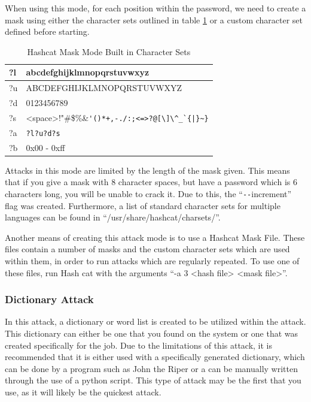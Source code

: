 				When using this mode, for each position within the password, we need to create a mask using either the character sets outlined in table \ref{tab:HashcatMaskCharSets} or a custom character set defined before starting. 
				\begin{table}[htb]
					\centering
				\begin{adjustbox}{max width=1\textwidth}
					\begin{tabular}{| l | l |}
						\hline
						?l & abcdefghijklmnopqrstuvwxyz \\ \hline
						?u & ABCDEFGHIJKLMNOPQRSTUVWXYZ \\ \hline
						?d & 0123456789 \\ \hline
						?s & <space>!"\#\$\%\&\verb!'()*+,-./:;<=>?@[\]\^_`{|}~}! \\ \hline
						?a & \verb+?l?u?d?s+ \\ \hline
						?b & 0x00 - 0xff \\ \hline
					\end{tabular}
				\end{adjustbox}
					\caption{Hashcat Mask Mode Built in Character Sets}
					\label{tab:HashcatMaskCharSets}
				\end{table}
				Attacks in this mode are limited by the length of the mask given. 
				This means that if you give a mask with 8 character spaces, but have a password which is 6 characters long, you will be unable to crack it. 
				Due to this, the ``\verb+--+increment'' flag was created. 
				Furthermore, a list of standard character sets for multiple languages can be found in ``/usr/share/hashcat/charsets/''.

				Another means of creating this attack mode is to use a Hashcat Mask File. 
				These files contain a number of masks and the custom character sets which are used within them, in order to run attacks which are regularly repeated. 
				To use one of these files, run Hash cat with the arguments ``-a 3 <hash file> <mask file>''.

			\subsubsection{Dictionary Attack}
				In this attack, a dictionary or word list is created to be utilized within the attack. 
				This dictionary can either be one that you found on the system or one that was created specifically for the job. 
				Due to the limitations of this attack, it is recommended that it is either used with a specifically generated dictionary, which can be done by a program such as John the Riper or
				a can be manually written through the use of a python script. 
				This type of attack may be the first that you use, as it will likely be the quickest attack. 

